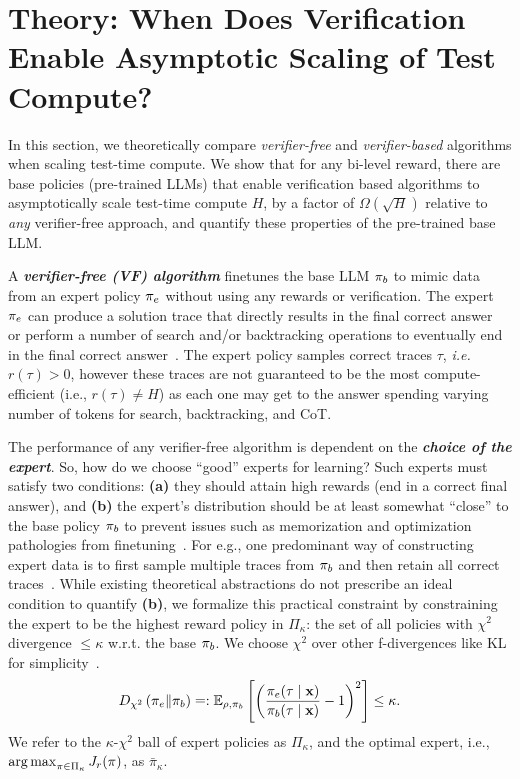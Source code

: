 \vspace{-0.2cm}
\section{Theory: When Does Verification Enable Asymptotic Scaling of Test Compute?}
\vspace{-0.1cm}
\label{sec:theory-compare-vfree-vbased}

In this section, we theoretically compare \emph{verifier-free} and \emph{verifier-based} algorithms when scaling test-time compute. We show that for any bi-level reward, there are base policies (pre-trained LLMs) that enable verification based algorithms to asymptotically scale test-time compute $H$, by a factor of $\Omega(\sqrt{H})$ relative to \emph{any} verifier-free approach, and quantify these properties of the pre-trained base LLM.

A \emph{\textbf{verifier-free (VF) algorithm}} finetunes the base LLM $\pi_b$ to mimic data from an expert policy $\pi_e$ without using any rewards or verification. The expert $\pi_e$ can produce a solution trace that directly results in the final correct answer~\cite{zelikman2022star} or perform a number of search and/or backtracking operations to eventually end in the final correct answer~\cite{gandhi2024stream}. The expert policy samples correct  traces $\tau$, \textit{i.e.} $r(\tau) > 0$, however these traces are not guaranteed to be the most compute-efficient (i.e., $r(\tau) \neq H$) as each one may get to the answer spending varying number of tokens for search, backtracking, and CoT. 

The performance of any verifier-free algorithm is dependent on the \textbf{\emph{choice of the expert}}. So, how do we choose ``good'' experts for learning? Such experts must satisfy two conditions: \textbf{(a)} they should attain high rewards (end in a correct final answer),
and \textbf{(b)} the expert's distribution should be at least somewhat ``close'' to the base policy $\pi_b$ to prevent issues such as memorization and optimization pathologies from finetuning~\citep{kang2024unfamiliar,tajwar2024preference}.
For e.g., one predominant way of constructing expert data is to first sample multiple traces from $\pi_b$ and then retain all correct traces~\citep{zelikman2022star,gulcehre2023reinforced}. While existing theoretical abstractions do not prescribe an ideal condition to quantify \textbf{(b)}, we formalize this practical constraint by constraining the expert to be the highest reward policy in $\Pi_\kappa$: the set of all policies with   $\chi^2$ divergence $\leq\kappa$ w.r.t. the base $\pi_b$. We choose $\chi^2$ over other f-divergences like KL for simplicity~\citep{huang2024correcting}. 
{
\setlength{\abovedisplayskip}{4pt}
\setlength{\belowdisplayskip}{4pt}
\begin{align}
   D_{\chi^2} \left( \pi_e \| \pi_b \right) \mathrel{\mathop=}: \mathbb{E}_{\rho,\pi_b}  \left[\left( \frac{\pi_e(\tau\mid\mathbf{x})}{\pi_b(\tau\mid\mathbf{x})} -1 \right)^2 \right] \le \kappa.
\end{align}
}We refer to the $\kappa$-$\chi^2$ ball of expert policies as $\Pi_{\kappa}$, and the optimal expert, i.e., $\operatorname*{arg\,max}_{\pi \in \Pi_{\kappa}} J_r(\pi)$, as $\bar{\pi}_{\kappa}$.

